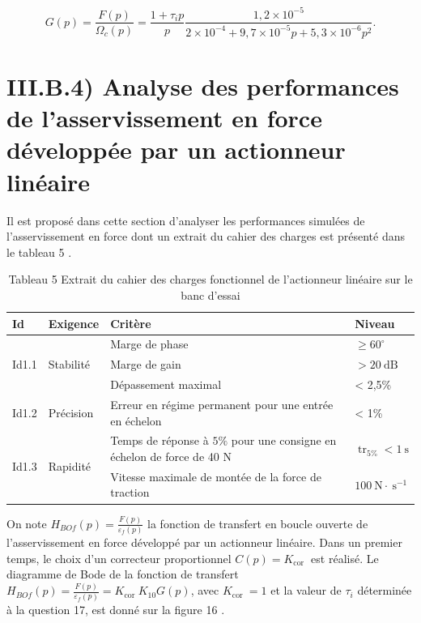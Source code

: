 \documentclass[10pt]{article}
\begin{document}
$$
G(p)=\frac{F(p)}{\Omega_{c}(p)}=\frac{1+\tau_{i} p}{p} \frac{1,2 \times 10^{-5}}{2 \times 10^{-4}+9,7 \times 10^{-5} p+5,3 \times 10^{-6} p^{2}} .
$$

\section{III.B.4) Analyse des performances de l'asservissement en force développée par un actionneur linéaire}
Il est proposé dans cette section d'analyser les performances simulées de l'asservissement en force dont un extrait du cahier des charges est présenté dans le tableau 5 .

\begin{table}[h]
\begin{center}
\begin{tabular}{|l|l|l|l|}
\hline
Id & Exigence & Critère & Niveau \\
\hline
\multirow[t]{3}{*}{Id1.1} & \multirow[t]{3}{*}{Stabilité} & Marge de phase & $\geqslant 60^{\circ}$ \\
\hline
 &  & Marge de gain & $>20 \mathrm{~dB}$ \\
\hline
 &  & Dépassement maximal & < 2,5\% \\
\hline
Id1.2 & Précision & Erreur en régime permanent pour une entrée en échelon & < 1\% \\
\hline
\multirow[t]{2}{*}{Id1.3} & \multirow[t]{2}{*}{Rapidité} & Temps de réponse à $5 \%$ pour une consigne en échelon de force de 40 N & $\operatorname{tr}_{5 \%}<1 \mathrm{~s}$ \\
\hline
 &  & Vitesse maximale de montée de la force de traction & $100 \mathrm{~N} \cdot \mathrm{~s}^{-1}$ \\
\hline
\end{tabular}
\captionsetup{labelformat=empty}
\caption{Tableau 5 Extrait du cahier des charges fonctionnel de l'actionneur linéaire sur le banc d'essai}
\end{center}
\end{table}

On note $H_{B O f}(p)=\frac{F(p)}{\varepsilon_{f}(p)}$ la fonction de transfert en boucle ouverte de l'asservissement en force développé par un actionneur linéaire. Dans un premier temps, le choix d'un correcteur proportionnel $C(p)=K_{\text {cor }}$ est réalisé. Le diagramme de Bode de la fonction de transfert $H_{B O f}(p)=\frac{F(p)}{\varepsilon_{f}(p)}=K_{\text {cor }} K_{10} G(p)$, avec $K_{\text {cor }}=1$ et la valeur de $\tau_{i}$ déterminée à la question 17, est donné sur la figure 16 .
\end{document}
